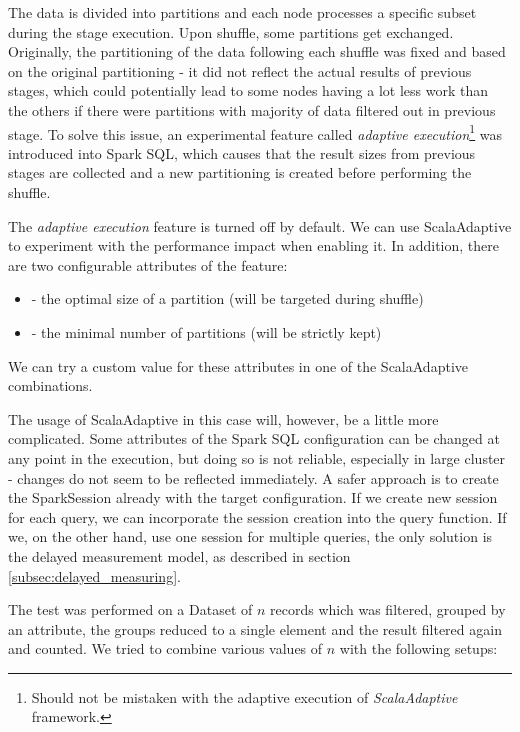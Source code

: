 The data is divided into partitions and each node processes a specific subset during the stage execution. Upon shuffle, some partitions get exchanged. Originally, the partitioning of the data following each shuffle was fixed and based on the original partitioning - it did not reflect the actual results of previous stages, which could potentially lead  to some nodes having a lot less work than the others if there were partitions with majority of data filtered out in previous stage. To solve this issue, an experimental feature called \textit{adaptive execution}\footnote{Should not be mistaken with the adaptive execution of \textit{ScalaAdaptive} framework.} was introduced into Spark SQL, which causes that the result sizes from previous stages are collected and a new partitioning is created before performing the shuffle.

The \textit{adaptive execution} feature is turned off by default. We can use ScalaAdaptive to experiment with the performance impact when enabling it. In addition, there are two configurable attributes of the feature:
\begin{itemize}
	\item {} - the optimal size of a partition (will be targeted during shuffle)
	\item {} - the minimal number of partitions (will be strictly kept)
\end{itemize}
We can try a custom value for these attributes in one of the ScalaAdaptive combinations.

The usage of ScalaAdaptive in this case will, however, be a little more complicated. Some attributes of the Spark SQL configuration can be changed at any point in the execution, but doing so is not reliable, especially in large cluster - changes do not seem to be reflected immediately. A safer approach is to create the SparkSession already with the target configuration. If we create new session for each query, we can incorporate the session creation into the query function. If we, on the other hand, use one session for multiple queries, the only solution is the delayed measurement model, as described in section \ref{subsec:delayed_measuring}. 

The test was performed on a Dataset of $n$ records which was filtered, grouped by an attribute, the groups reduced to a single element and the result filtered again and counted. We tried to combine various values of $n$ with the following setups:

